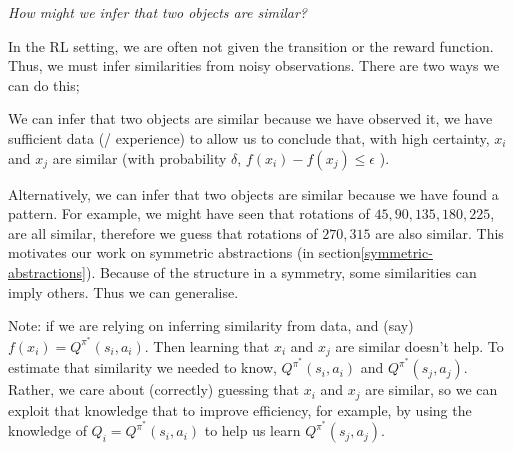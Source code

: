 \begin{displayquote}
	\textsl{How might we infer that two objects are similar?}
\end{displayquote}


In the RL setting, we are often not given the transition or the reward function.
Thus, we must infer similarities from noisy observations. There are two ways we can do this;

\hspace{\parindent}We can infer that two objects are similar because we have observed it,
we have sufficient data (/ experience) to allow us to conclude that, with high
certainty, $x_i$ and $x_j$ are similar (with probability $\delta$, $f(x_i) - f(x_j) \le \epsilon$ ).

\hspace{\parindent}Alternatively, we can infer that two objects are similar because we have found a pattern.
For example, we might have seen that rotations of $45, 90, 135$$, 180, 225$, are all similar,
therefore we guess that rotations of $270, 315$ are also similar.
This motivates our work on symmetric abstractions (in section\ref{symmetric-abstractions}).
Because of the structure in a symmetry, some similarities can imply others. Thus we can generalise.

Note: if we are relying on inferring similarity from data, and (say) $f(x_i) = Q^{\pi^{* }}(s_i, a_i)$.
Then learning that $x_i$ and $x_j$ are similar doesn't help.
To estimate that similarity we needed to know, $Q^{\pi^{* }}(s_i, a_i)$ and $Q^{\pi^{* }}(s_j, a_j)$.
Rather, we care about (correctly) guessing that $x_i$ and $x_j$ are similar, so we can
exploit that knowledge that to improve efficiency,
for example, by using the knowledge of $Q_i = Q^{\pi^{* }}(s_i, a_i)$ to help us learn $Q^{\pi^{* }}(s_j, a_j)$.
